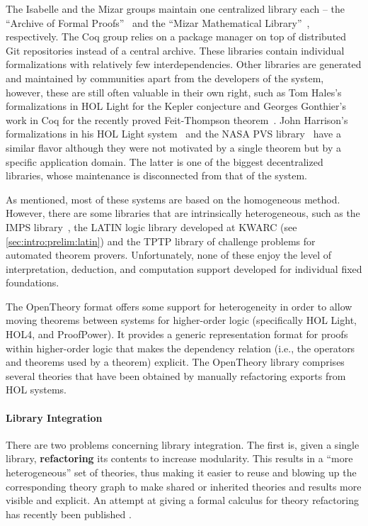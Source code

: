 The Isabelle and the Mizar groups maintain one centralized library each -- the ``Archive
of Formal Proofs''~\cite{AFP:online} and the ``Mizar Mathematical
Library''~\cite{MizarKB:on}, respectively.  The Coq group relies on a package manager on top of distributed Git repositories instead of a central archive.  These libraries contain individual formalizations with relatively few
interdependencies. Other libraries are generated and maintained by communities apart from the developers of the system, however, these are still often valuable in their own right, such as Tom Hales's formalizations in
HOL Light for the Kepler conjecture \cite{HalAdaBau:afpkc15} and Georges Gon\-thier's work in Coq for
the recently proved Feit-Thompson theorem~\cite{oddorder}.  John Harrison's
formalizations in his HOL Light system~\cite{hollight} and the NASA PVS
library~\cite{PVSlibraries:on} have a similar flavor although they were not motivated by a
single theorem but by a specific application domain.  The latter is one of the biggest
decentralized libraries, whose maintenance is disconnected from that of the system. \medskip

As mentioned, most of these systems are based on the homogeneous method. However, there are some libraries that are intrinsically heterogeneous, such as the IMPS library~\cite{ImpsKB:on}, the
{\textsf LATIN} logic library \cite{CHKMR:latinabs:11} developed at KWARC (see \autoref{sec:intro:prelim:latin}) and the TPTP library \cite{tptp} of
challenge problems for automated theorem provers. Unfortunately, none of these enjoy the level
of interpretation, deduction, and computation support developed for individual fixed foundations.

The OpenTheory format \cite{opentheory} offers some support for heterogeneity in order to
allow moving theorems between systems for higher-order logic (specifically HOL Light,
HOL4, and ProofPower).  It provides a generic representation format for proofs within
higher-order logic that makes the dependency relation (i.e., the operators and theorems
used by a theorem) explicit.  The OpenTheory library
comprises several theories that have been obtained by manually refactoring exports from
HOL systems.

\paragraph*{Library Integration} There are two problems concerning library integration. The first is, given a single library, \textbf{refactoring} its contents to increase modularity. This results in a ``more heterogeneous'' set of theories, thus making it easier to reuse and blowing up the corresponding theory graph to make shared or inherited theories and results more visible and explicit. An attempt at giving a formal calculus for theory refactoring has recently been published \cite{Autexier15:StructureFormation}.

